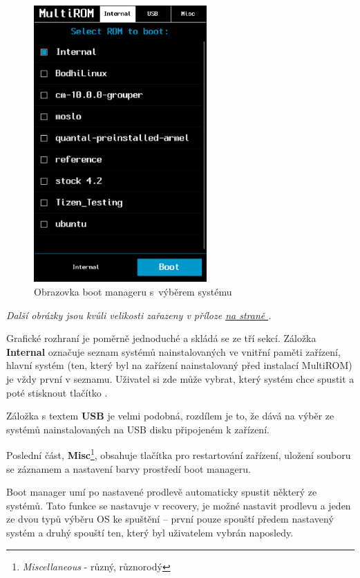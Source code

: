 \documentclass[12pt, a4paper, oneside]{article}
\newcommand{\B}{\textbf} %
\newcommand{\It}{\textit}  %
\newcommand*{\attref}[1]{\hyperref[{#1}]{\uv{\nameref*{#1}} na straně \pageref{#1}}}
\begin{document}
\begin{figure}[H]
\begin{center}
 \includegraphics[width=250px]{img/boot_manager.png}
\caption{Obrazovka boot manageru s~výběrem systému}
\end{center}
\end{figure}
\vspace{-20pt}
\noindent \It{Další obrázky jsou kvůli velikosti zařazeny v příloze \attref{obrazky}.}

Grafické rozhraní je poměrně jednoduché a skládá se ze tří sekcí. Záložka \B{Internal} označuje seznam systémů nainstalovaných ve vnitřní paměti zařízení, hlavní systém (ten, který byl na zařízení nainstalovaný před instalací MultiROM) je vždy první v seznamu. Uživatel si zde může vybrat, který systém chce spustit a poté stisknout tlačítko .

Záložka s textem \B{USB} je velmi podobná, rozdílem je to, že dává na výběr ze systémů nainstalovaných na USB disku připojeném k zařízení.

Poslední část, \B{Misc}\footnote{\It{Miscellaneous} - různý, různorodý}, obsahuje tlačítka pro restartování zařízení, uložení souboru se záznamem a nastavení barvy prostředí boot manageru.

Boot manager umí po nastavené prodlevě automaticky spustit některý ze systémů. Tato funkce se nastavuje v recovery, je možné nastavit prodlevu a jeden ze dvou typů výběru OS ke spuštění -- první pouze spouští předem nastavený systém a druhý spouští ten, který byl uživatelem vybrán naposledy.
\end{document}
